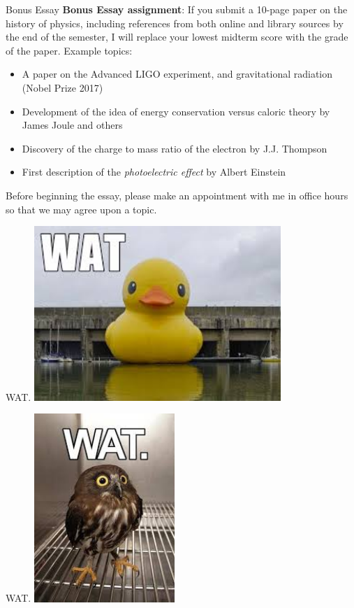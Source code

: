\documentclass{beamer}
\begin{document}
\begin{frame}{Bonus Essay}
\small
\textbf{\alert{Bonus Essay assignment}}: If you submit a 10-page paper on the history of physics, including references from both online and library sources by the end of the semester, I will replace your lowest midterm score with the grade of the paper.  Example topics:
\begin{itemize}
\item A paper on the Advanced LIGO experiment, and gravitational radiation (Nobel Prize 2017)
\item Development of the idea of energy conservation versus caloric theory by James Joule and others
\item Discovery of the charge to mass ratio of the electron by J.J. Thompson
\item First description of the \textit{photoelectric effect} by Albert Einstein
\end{itemize}
Before beginning the essay, please make an appointment with me in office hours so that we may agree upon a topic.
\end{frame}

\begin{frame}{WAT.}
\centering
\includegraphics[width=0.7\textwidth]{figures/watduck.jpeg}
\end{frame}

\begin{frame}{WAT.}
\centering
\includegraphics[width=0.4\textwidth]{figures/watowl.jpeg}
\end{frame}
\end{document}
